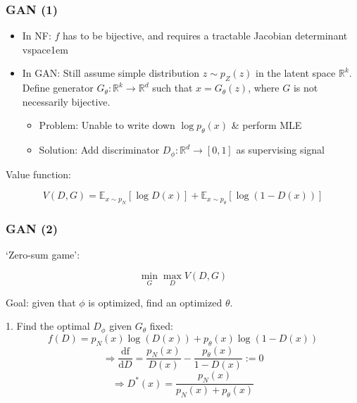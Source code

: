 \documentclass{beamer}
\begin{document}
\begin{frame}[t]
\frametitle{GAN (1)}
\begin{itemize}
    \item In NF: $f$ has to be bijective, and requires a tractable Jacobian determinant
    vspace{1em}
    \item In GAN: Still assume simple distribution $z\sim p_Z(z)$ in the latent space $\mathbb{R}^k$.\\ Define generator $G_\theta: \mathbb{R}^k\to \mathbb{R}^d$ such that $x = G_\theta(z)$, where $G$ is not necessarily bijective.
    \begin{itemize}
        \item Problem: Unable to write down $\log p_\theta (x)$ \& perform MLE
        \vspace{1em}
        \item Solution: Add discriminator $D_\phi:\mathbb{R}^d\to [0,1]$ as supervising signal
    \end{itemize}
\end{itemize}

\vspace{1em}

Value function:
\begin{tcolorbox}[colback=blue!1!white,
                  colframe=blue!75!black]
$$
V(D, G)=\mathbb{E}_{x\sim p_N}[\log D(x)]+\mathbb{E}_{x\sim p_\theta}[\log(1-D(x))]
$$
\end{tcolorbox}

\end{frame}

\begin{frame}[t]
\frametitle{GAN (2)}
`Zero-sum game':
\begin{tcolorbox}[colback=blue!1!white,
                  colframe=blue!75!black]
$$
\min_G\max_DV(D, G)
$$
\end{tcolorbox}

Goal: given that $\phi$ is optimized, find an optimized $\theta$.\\
\vspace{1em}

1. Find the optimal $D_\phi$ given $G_\theta$ fixed:
$$
f(D)=p_N(x)\log(D(x))+p_\theta(x)\log(1-D(x))$$
$$
\Rightarrow \frac{\text{df}}{\text{d}D}=\frac{p_N(x)}{D(x)}-\frac{p_\theta(x)}{1-D(x)}:=0
$$
$$
\Rightarrow D^*(x)=\frac{p_N(x)}{p_N(x)+p_\theta(x)}
$$
\end{frame}
\end{document}
